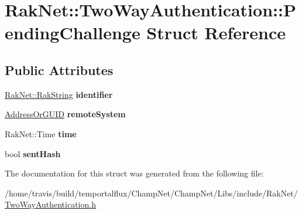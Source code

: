 \hypertarget{struct_rak_net_1_1_two_way_authentication_1_1_pending_challenge}{\section{Rak\-Net\-:\-:Two\-Way\-Authentication\-:\-:Pending\-Challenge Struct Reference}
\label{struct_rak_net_1_1_two_way_authentication_1_1_pending_challenge}
}
\subsection*{Public Attributes}
\begin{DoxyCompactItemize}
\item 
\hypertarget{struct_rak_net_1_1_two_way_authentication_1_1_pending_challenge_a68f3f76a3d224467b476aa4dd61b1a68}{\hyperlink{class_rak_net_1_1_rak_string}{Rak\-Net\-::\-Rak\-String} {\bfseries identifier}}\label{struct_rak_net_1_1_two_way_authentication_1_1_pending_challenge_a68f3f76a3d224467b476aa4dd61b1a68}

\item 
\hypertarget{struct_rak_net_1_1_two_way_authentication_1_1_pending_challenge_a748216276e4b6a89912e957a1ec2ce81}{\hyperlink{struct_rak_net_1_1_address_or_g_u_i_d}{Address\-Or\-G\-U\-I\-D} {\bfseries remote\-System}}\label{struct_rak_net_1_1_two_way_authentication_1_1_pending_challenge_a748216276e4b6a89912e957a1ec2ce81}

\item 
\hypertarget{struct_rak_net_1_1_two_way_authentication_1_1_pending_challenge_a2f3c814d014a4d607f94da08fbe98534}{Rak\-Net\-::\-Time {\bfseries time}}\label{struct_rak_net_1_1_two_way_authentication_1_1_pending_challenge_a2f3c814d014a4d607f94da08fbe98534}

\item 
\hypertarget{struct_rak_net_1_1_two_way_authentication_1_1_pending_challenge_a684f6f078d45519a719854017c5fc3e6}{bool {\bfseries sent\-Hash}}\label{struct_rak_net_1_1_two_way_authentication_1_1_pending_challenge_a684f6f078d45519a719854017c5fc3e6}

\end{DoxyCompactItemize}


The documentation for this struct was generated from the following file\-:\begin{DoxyCompactItemize}
\item 
/home/travis/build/temportalflux/\-Champ\-Net/\-Champ\-Net/\-Libs/include/\-Rak\-Net/\hyperlink{_two_way_authentication_8h}{Two\-Way\-Authentication.\-h}\end{DoxyCompactItemize}
